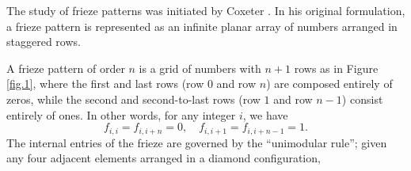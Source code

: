 \documentclass[11pt]{amsart}
\theoremstyle{plain}
\theoremstyle{definition}
\theoremstyle{remark}
\begin{document}
The study of frieze patterns was initiated by Coxeter \cite{Coxeter1971}.
In his original formulation, a frieze pattern is represented as an infinite
planar array
of numbers arranged in staggered rows.

A frieze pattern of order $n$ is a grid of numbers with $n+1$
rows as in Figure \ref{fig.1},
where the first and last rows (row $0$ and row $n$) are
composed entirely of zeros,
while the second and second-to-last rows (row $1$ and row $n-1$)
consist entirely of ones.
In other words, for any integer $i$, we have
    \begin{equation}
    f_{i,i} = f_{i,i+n} = 0, \quad f_{i,i+1} = f_{i,i+n-1} = 1.
    \end{equation}
The internal entries of the frieze are governed by the ``unimodular rule'';
given any four adjacent elements arranged in a diamond configuration,
\end{document}
